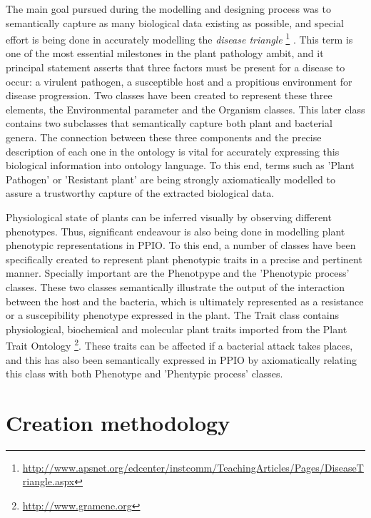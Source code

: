 \documentclass[sw]{iosart2c}
\newcommand{\myurl}[1]{\footnote{\url{#1}}}
\begin{document}
The main goal pursued during the modelling and designing process was to semantically capture as many biological data existing as possible, and special effort is being done in accurately modelling the {\itshape disease triangle} \myurl{http://www.apsnet.org/edcenter/instcomm/TeachingArticles/Pages/DiseaseTriangle.aspx} . This term is one of the most essential milestones in the plant pathology ambit, and it principal statement asserts that three factors must be present for a disease to occur: a virulent pathogen, a susceptible host and a propitious environment for disease progression. Two classes have been created to represent these three elements, the {\sf Environmental parameter} and the {\sf Organism} classes. This later class contains two subclasses that semantically capture both plant and bacterial genera. The connection between these three components and the precise description of each one in the ontology is vital for accurately expressing this biological information into ontology language. To this end, terms such as {\sf 'Plant Pathogen'} or { \sf 'Resistant plant'} are being strongly axiomatically modelled to assure a trustworthy capture of the extracted biological data.

Physiological state of plants can be inferred visually by observing different phenotypes. Thus, significant endeavour is also being done in modelling plant phenotypic representations in PPIO. To this end, a number of classes have been specifically created to represent plant phenotypic traits in a precise and pertinent manner. Specially important are the { \sf Phenotpype} and the {\sf 'Phenotypic process'} classes. These two classes semantically illustrate the output of the interaction between the host and the bacteria, which is ultimately represented as a resistance or a suscepibility phenotype expressed in the plant. The {\sf Trait} class contains physiological, biochemical and molecular plant traits imported from the Plant Trait Ontology \myurl{http://www.gramene.org}. These traits can be affected if a bacterial attack takes places, and this has also been semantically expressed in PPIO by axiomatically relating this class with both {\sf Phenotype} and {\sf 'Phentypic process'} classes. 


\section{Creation methodology}
\end{document}
